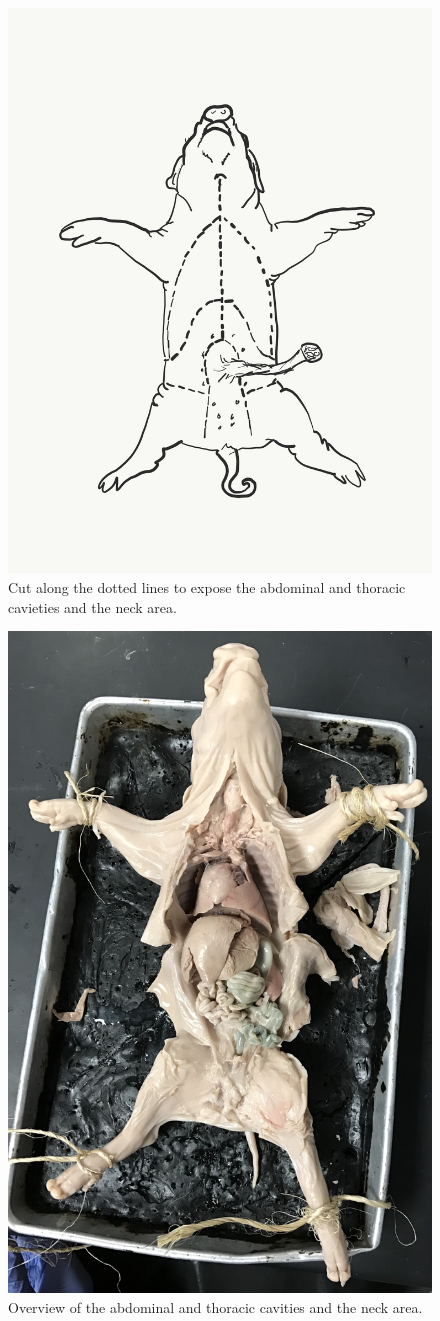 \begin{figure}

{\centering \includegraphics[width=0.7\linewidth]{./figures/pig/pig_dissection}

}

\caption{Cut along the dotted lines to expose the abdominal and thoracic cavieties and the neck area.}\label{fig:dissection}
\end{figure}

\begin{figure}

{\centering \includegraphics[width=0.7\linewidth]{./figures/pig/pig}

}

\caption{Overview of the abdominal and thoracic cavities and the neck area.}\label{fig:pig}
\end{figure}

